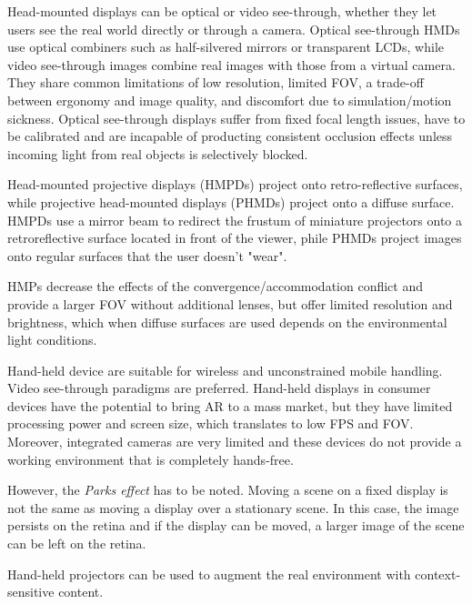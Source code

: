 \documentclass[a4paper]{article}
\begin{document}
Head-mounted displays can be optical or video see-through, whether they let users see the real world directly or through a camera.
Optical see-through HMDs use optical combiners such as half-silvered mirrors or transparent LCDs, while video see-through images combine real images with those from a virtual camera.
They share common limitations of low resolution, limited FOV, a trade-off between ergonomy and image quality, and discomfort due to simulation/motion sickness.
Optical see-through displays suffer from fixed focal length issues, have to be calibrated and are incapable of producting consistent occlusion effects unless incoming light from real objects is selectively blocked.

Head-mounted projective displays (HMPDs) project onto retro-reflective surfaces, while projective head-mounted displays (PHMDs) project onto a diffuse surface.
HMPDs use a mirror beam to redirect the frustum of miniature projectors onto a retroreflective surface located in front of the viewer, phile PHMDs project images onto regular surfaces that the user doesn't "wear".

HMPs decrease the effects of the convergence/accommodation conflict and provide a larger FOV without additional lenses, but offer limited resolution and brightness, which when diffuse surfaces are used depends on the environmental light conditions.

Hand-held device are suitable for wireless and unconstrained mobile handling. Video see-through paradigms are preferred. Hand-held displays in consumer devices have the potential to bring AR to a mass market, but they have limited processing power and screen size, which translates to low FPS and FOV. Moreover, integrated cameras are very limited and these devices do not provide a working environment that is completely hands-free.

However, the \emph{Parks effect} has to be noted. Moving a scene on a fixed display is not the same as moving a display over a stationary scene. In this case, the image persists on the retina and if the display can be moved, a larger image of the scene can be left on the retina.

Hand-held projectors can be used to augment the real environment with context-sensitive content.
\end{document}
